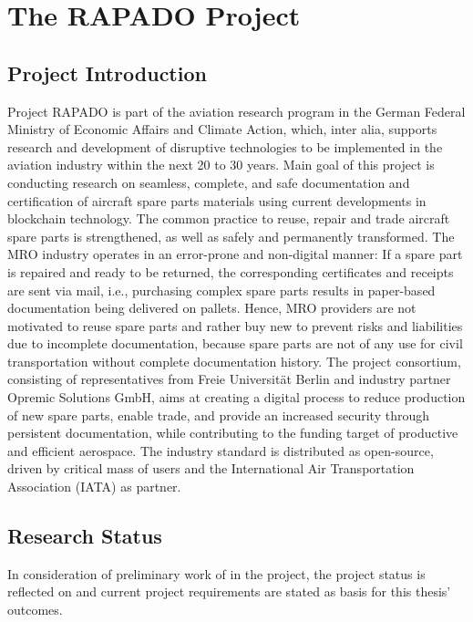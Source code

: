 \chapter{The RAPADO Project}
\section{Project Introduction}
Project RAPADO is part of the aviation research program in the German Federal Ministry of Economic Affairs and Climate Action, which, inter alia, supports research and development of disruptive technologies to be implemented in the aviation industry within the next 20 to 30 years. Main goal of this project is conducting research on seamless, complete, and safe documentation and certification of aircraft spare parts materials using current developments in blockchain technology. The common practice to reuse, repair and trade aircraft spare parts is strengthened, as well as safely and permanently transformed. The MRO industry operates in an error-prone and non-digital manner: If a spare part is repaired and ready to be returned, the corresponding certificates and receipts are sent via mail, i.e., purchasing complex spare parts results in paper-based documentation being delivered on pallets. Hence, MRO providers are not motivated to reuse spare parts and rather buy new to prevent risks and liabilities due to incomplete documentation, because spare parts are not of any use for civil transportation without complete documentation history. The project consortium, consisting of representatives from Freie Universit{\"a}t Berlin and industry partner Opremic Solutions GmbH, aims at creating a digital process to reduce production of new spare parts, enable trade, and provide an increased security through persistent documentation, while contributing to the funding target of productive and efficient aerospace. The industry standard is distributed as open-source, driven by critical mass of users and the International Air Transportation Association (IATA) as partner.

\section{Research Status}
In consideration of preliminary work of \citet{ZedelJ, Wickboldt2019BlockchainFW, semesterproject} in the project, the project status is reflected on and current project requirements are stated as basis for this thesis' outcomes.

